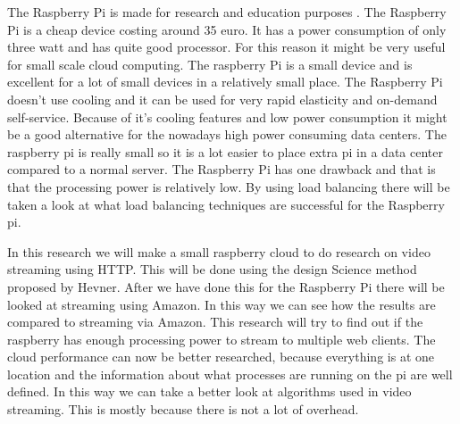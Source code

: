 \documentclass{sig-alternate-br}
\begin{document}
The Raspberry Pi is made for research and education purposes \cite{raspberry-pi}. The Raspberry Pi is a cheap device costing around 35 euro. It has a power consumption of only three watt and has quite good processor. For this reason it might be very useful for small scale cloud computing. The raspberry Pi is a small device and is excellent for a lot of small devices in a relatively small place. The Raspberry Pi doesn't use cooling and it can be used for very rapid elasticity and on-demand self-service. Because of it's cooling features and low power consumption it might be a good alternative for the nowadays high power consuming data centers. The raspberry pi is really small so it is a lot easier to place extra pi in a data center compared to a normal server. The Raspberry Pi has one drawback and that is that the processing power is relatively low. By using load balancing there will be taken a look at what load balancing techniques are successful for the Raspberry pi. 

In this research we will make a small raspberry cloud to do research on video streaming using HTTP. This will be done using the design Science method proposed by Hevner\cite{hevner:2007}. After we have done this for the Raspberry Pi there will be looked at streaming using Amazon. In this way we can see how the results are compared to streaming via Amazon. This research will try to find out if the raspberry has enough processing power to stream to multiple web clients. The cloud performance can now be better researched, because everything is at one location and the information about what processes are running on the pi are well defined. In this way we can take a better look at algorithms used in video streaming. This is mostly because there is not a lot of overhead. 



%
%
\vspace{50 mm}
\newpage
\end{document}
